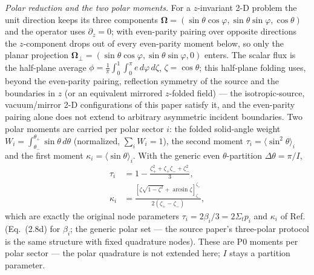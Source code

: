 \documentclass[11pt,a4paper]{article}
\begin{document}
\emph{Polar reduction and the two polar moments.}
For a $z$-invariant 2-D problem the unit direction keeps its three
components $\boldsymbol{\Omega}=(\sin\theta\cos\varphi,
\sin\theta\sin\varphi,\cos\theta)$ and the operator uses
$\partial_z=0$; with even-parity pairing over opposite directions the
$z$-component drops out of every even-parity moment below, so only the
planar projection $\boldsymbol{\Omega}_\perp=(\sin\theta\cos\varphi,
\sin\theta\sin\varphi,0)$ enters. The scalar flux is the half-plane
average
$\phi=\frac{1}{\pi}\int_0^1\!\!\int_0^\pi e\,d\varphi\,d\zeta$,
$\zeta=\cos\theta$; this half-plane folding uses, beyond the even-parity
pairing, reflection symmetry of the source and the boundaries in $z$
(or an equivalent mirrored $z$-folded field) --- the isotropic-source,
vacuum/mirror 2-D configurations of this paper satisfy it, and the
even-parity pairing alone does not extend to arbitrary asymmetric
incident boundaries. Two polar moments are carried per polar sector $i$:
the folded solid-angle weight
$W_i=\int_{\theta_-}^{\theta_+}\sin\theta\,d\theta$ (normalized,
$\sum_i W_i=1$), the second moment
$\tau_i=\langle\sin^2\theta\rangle_i$ and the first moment
$\kappa_i=\langle\sin\theta\rangle_i$. With the generic even
$\theta$-partition $\Delta\theta=\pi/I$,
\begin{align}
\tau_i &= 1-\frac{\zeta_+^2+\zeta_+\zeta_-+\zeta_-^2}{3}, \\
\kappa_i &= \frac{[\zeta\sqrt{1-\zeta^2}+\arcsin\zeta]_{\zeta_-}^{\zeta_+}}
{2(\zeta_+-\zeta_-)},
\end{align}
which are exactly the original node parameters
$\tau_i=2\beta_i/3=2\Sigma_t p_i$ and $\kappa_i$
of Ref.~\cite{psn2027} (Eq.~(2.8d) for $\beta_i$; the generic polar
set --- the source paper's three-polar protocol is the same structure
with fixed quadrature nodes). These are P0
moments per polar sector --- the polar quadrature is not extended
here; $I$ stays a partition parameter.
\end{document}

